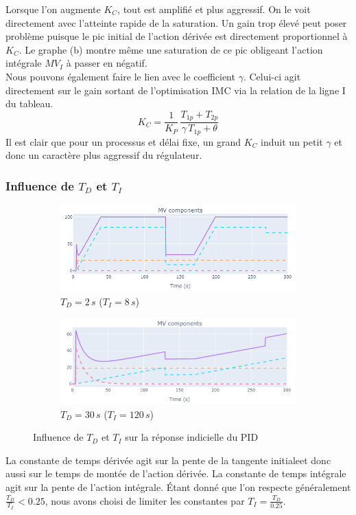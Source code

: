 Lorsque l'on augmente $K_C$, tout est amplifié et plus aggressif. On le voit directement avec l'atteinte rapide de la saturation.
Un gain trop élevé peut poser problème puisque le pic initial de l'action dérivée est directement proportionnel à $K_C$.
Le graphe (b) montre même une saturation de ce pic obligeant l'action intégrale $MV_I$ à passer en négatif.\\
Nous pouvons également faire le lien avec le coefficient $\gamma$. Celui-ci agit directement sur le gain sortant de l'optimisation IMC via la relation de la ligne I du tableau.
\begin{equation*}
    K_C = \frac{1}{K_P} \, \frac{T_{1p} + T_{2p}}{\gamma \, T_{1p} + \theta}
\end{equation*}
Il est clair que pour un processus et délai fixe, un grand $K_C$ induit un petit $\gamma$ et donc un caractère plus aggressif du régulateur.

\subsubsection{Influence de \texorpdfstring{$T_D$}{Td} et \texorpdfstring{$T_I$}{Ti}}
\begin{figure}[H]
    \centering
    \begin{subfigure}[b]{0.48\textwidth}
        \includegraphics[width=\textwidth]{../Plots/PID/PID_Response_low_Td.png}
        \caption{$T_D = 2\,s$ ($T_I = 8\,s$)}
    \end{subfigure}
    \begin{subfigure}[b]{0.48\textwidth}
        \includegraphics[width=\textwidth]{../Plots/PID/PID_Response_high_Td.png}
        \caption{$T_D = 30\,s$ ($T_I = 120\,s$)}
    \end{subfigure}
    \caption{Influence de $T_D$ et $T_I$ sur la réponse indicielle du PID}
    \label{fig:Td_Influence_PID}
\end{figure}
La constante de temps dérivée agit sur la pente de la tangente initialeet donc aussi sur le temps de montée de l'action dérivée.
La constante de temps intégrale agit sur la pente de l'action intégrale.
Étant donné que l'on respecte généralement $\frac{T_D}{T_I} < 0.25$, nous avons choisi de limiter les constantes par $T_I = \frac{T_D}{0.25}$.

